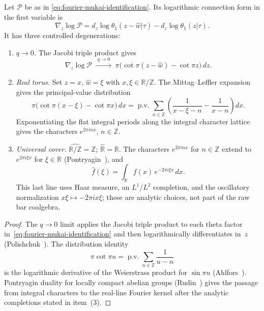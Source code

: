 \begin{proposition}
\label{prop:fourier-poincare-degeneration}
Let $\mathcal{P}$ be as in
\eqref{eq:fourier-mukai-identification}. Its logarithmic connection
form in the first variable is
\[
\nabla_z\log\mathcal P
=d_z\log\theta_1(z-\hat w|\tau)-d_z\log\theta_1(z|\tau).
\]
It has three controlled degenerations:
\begin{enumerate}
\item \emph{$q \to 0$.}
 The Jacobi triple product gives
 \begin{equation}\label{eq:fourier-poincare-degen-Gm}
 \nabla_z\log\mathcal P
 \;\xrightarrow{\;q \to 0\;}\;
 \pi\bigl(\cot\pi(z-\hat w)-\cot\pi z\bigr)\,dz .
 \end{equation}

\item \emph{Real torus.}
 Set $z = x$, $\hat{w} = \xi$ with
 $x,\xi \in \mathbb{R}/\mathbb{Z}$. The Mittag--Leffler expansion
 gives the principal-value distribution
 \begin{equation}\label{eq:fourier-sine-product}
 \pi\bigl(\cot\pi(x-\xi)-\cot\pi x\bigr)\,dx
 = \operatorname{p.v.}\!\sum_{n\in\mathbb Z}
 \left(\frac{1}{x-\xi-n}-\frac{1}{x-n}\right)dx .
 \end{equation}
 Exponentiating the flat integral periods along the integral
 character lattice gives the characters $e^{2\pi i n x}$,
 $n\in\mathbb Z$.

\item \emph{Universal cover.}
 $\widehat{\mathbb{R}/\mathbb{Z}} = \mathbb{Z}$;
 $\widehat{\mathbb{R}} = \mathbb{R}$. The characters
$e^{2\pi inx}$ for $n \in \mathbb{Z}$ extend to
$e^{2\pi i\xi x}$ for $\xi \in \mathbb{R}$
 \textup{(}Pontryagin~\cite{Pont66}\textup{)}, and
 \begin{equation}\label{eq:fourier-integral-from-FM}
 \hat{f}(\xi)
 = \int_{\mathbb{R}} f(x)\,e^{-2\pi i\xi x}\,dx.
 \end{equation}
 This last line uses Haar measure, an $L^1/L^2$ completion, and the
 oscillatory normalization $x\xi\mapsto -2\pi i x\xi$; these are
 analytic choices, not part of the raw bar coalgebra.
\end{enumerate}
\end{proposition}

\begin{proof}
The $q \to 0$ limit applies the Jacobi triple product to each
theta factor in~\eqref{eq:fourier-mukai-identification} and then
logarithmically differentiates in~$z$
(Polishchuk~\cite[\S16.2]{Pol03}). The distribution identity
\[
\pi\cot\pi u=\operatorname{p.v.}\!\sum_{n\in\mathbb Z}\frac{1}{u-n}
\]
is the logarithmic derivative of the Weierstrass product for
$\sin\pi u$ (Ahlfors~\cite[\S5.2]{Ahlfors79}). Pontryagin duality for
locally compact abelian groups (Rudin~\cite[\S1.7]{Rudin62}) gives
the passage from integral characters to the real-line Fourier kernel
after the analytic completions stated in item~(3).
\end{proof}

